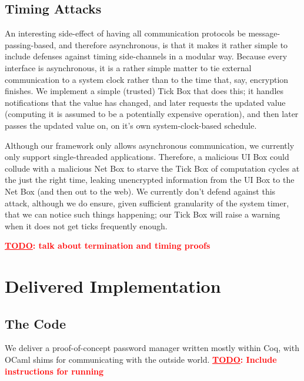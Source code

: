 \documentclass{article}
\newcommand{\todo}[1]{\textbf{\textcolor{red}{\underline{TODO}: #1}}}
\begin{document}
\subsection{Timing Attacks}\label{sec:timing-details}
An interesting side-effect of having all communication protocols be message-passing-based, and therefore asynchronous, is that it makes it rather simple to include defenses against timing side-channels in a modular way.  Because every interface is asynchronous, it is a rather simple matter to tie external communication to a system clock rather than to the time that, say, encryption finishes.  We implement a simple (trusted) Tick Box that does this; it handles notifications that the value has changed, and later requests the updated value (computing it is assumed to be a potentially expensive operation), and then later passes the updated value on, on it's own system-clock-based schedule.

Although our framework only allows asynchronous communication, we currently only support single-threaded applications.  Therefore, a malicious UI Box could collude with a malicious Net Box to starve the Tick Box of computation cycles at the just the right time, leaking unencrypted information from the UI Box to the Net Box (and then out to the web).  We currently don't defend against this attack, although we do ensure, given sufficient granularity of the system timer, that we can notice such things happening; our Tick Box will raise a warning when it does not get ticks frequently enough.

\todo{talk about termination and timing proofs}

\section{Delivered Implementation}
\subsection{The Code}
We deliver a proof-of-concept password manager written mostly within Coq, with OCaml shims for communicating with the outside world.  \todo{Include instructions for running}
\end{document}
